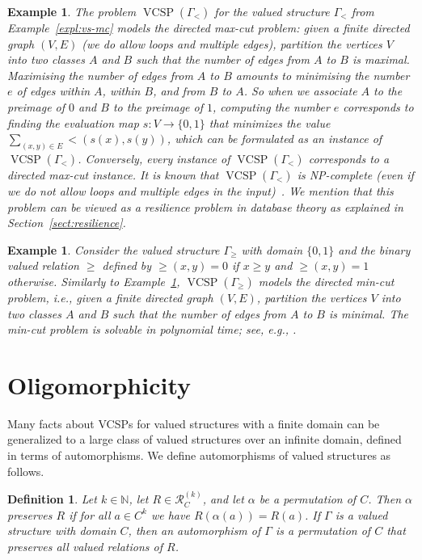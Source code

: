 \documentclass[nonacm]{acmart}
\DeclareMathOperator{\VCSP}{VCSP}
\newtheorem{definition}[theorem]{Definition}
\newtheorem{expl}[theorem]{Example}
\begin{document}
\begin{expl}\label{expl:mc}
The problem $\VCSP(\Gamma_<)$ for the valued structure $\Gamma_<$ from Example~\ref{expl:vs-mc} models the \emph{directed max-cut} problem: given a finite directed graph $(V,E)$ (we do allow loops and multiple edges), partition the vertices $V$ into two classes $A$ and $B$ such that the number of edges from $A$ to $B$ is maximal. Maximising the number of edges from $A$ to $B$ amounts to minimising the number $e$ of edges within $A$, within $B$, and from $B$ to $A$. So when we associate $A$ to the preimage of $0$
and $B$ to the preimage of $1$, computing the number $e$ corresponds to finding the evaluation map $s \colon V \rightarrow \{0,1\}$  that minimizes the value $\sum_{(x,y) \in E} {<}(s(x),s(y))$,
which can be formulated as an instance of 
$\VCSP(\Gamma_<)$. Conversely, every instance of $\VCSP(\Gamma_<)$ corresponds to a directed max-cut instance.   
It is known that $\VCSP(\Gamma_{<})$ is NP-complete (even if we do not allow loops and multiple edges in the input)~\cite{GareyJohnson}. We mention that this problem can be viewed as a resilience problem in database theory as explained in Section~\ref{sect:resilience}.
\end{expl}

\begin{expl}\label{expl:min-cut}
Consider the valued structure $\Gamma_{\geq}$ with domain $\{0,1\}$ and the binary valued relation $\geq$ defined by ${\geq}(x,y)=0$ if $x \geq y$ and ${\geq}(x,y)=1$ otherwise. Similarly to Example~\ref{expl:mc}, $\VCSP(\Gamma_{\geq})$ models the directed min-cut problem, i.e., given a finite directed graph $(V,E)$, partition the vertices $V$ into two classes $A$ and $B$ such that the number of edges from $A$ to $B$ is minimal. The min-cut problem is solvable in polynomial time; see, e.g., \cite{max-flow}.
\end{expl}

\section{Oligomorphicity}
\label{sect:oligo}
Many facts about VCSPs for valued structures with a finite domain can be generalized to a large class of valued structures over an infinite domain,   defined in terms of automorphisms. 
We define automorphisms of valued structures as follows.

\begin{definition} 
Let $k \in {\mathbb N}$, 
let $R \in {\mathscr R}^{(k)}_C$, and let $\alpha$ be a permutation of $C$. Then $\alpha$ \emph{preserves} $R$ if for all $a \in C^k$
we have $R(\alpha(a)) = R(a)$. 
If $\Gamma$ is a valued structure with domain $C$, then 
an \emph{automorphism} of $\Gamma$ is a permutation of $C$ that preserves all valued relations of $R$. 
\end{definition}
\end{document}
